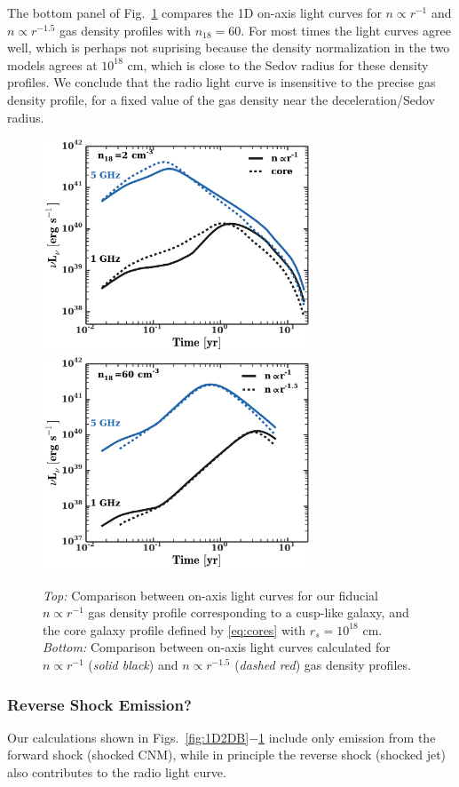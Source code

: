 \documentclass[usenatbib,fleqn]{mnras}
\begin{document}
The bottom panel of Fig.~\ref{fig:cores} compares the 1D on-axis light
curves for $n\propto r^{-1}$ and $n\propto r^{-1.5}$ gas density
profiles with $n_{18}=60$. For most times the light curves agree well,
which is perhaps not suprising because the density normalization in
the two models agrees at $10^{18}$ cm, which is close to the Sedov
radius for these density profiles.  We conclude that the radio light
curve is insensitive to the precise gas density profile, for a fixed
value of the gas density near the deceleration/Sedov radius.

\begin{figure} 
  \includegraphics[width=8cm]{fig_cores.pdf}
  \includegraphics[width=8cm]{profs2.pdf}
  \caption{\label{fig:cores} {\it Top:} Comparison between on-axis
    light curves for our fiducial $n\propto r^{-1}$ gas density
    profile corresponding to a cusp-like galaxy, and the core galaxy
    profile defined by \eqref{eq:cores} with $r_s=10^{18}$ cm. {\it
      Bottom:} Comparison between on-axis light curves calculated for
    $n\propto r^{-1}$ ({\it solid black}) and $n\propto r^{-1.5}$
    ({\it dashed red}) gas density profiles.}
\end{figure}


\subsubsection{Reverse Shock Emission?}
Our calculations shown in Figs.~\ref{fig:1D2DB}$-$\ref{fig:cores}
include only emission from the forward shock (shocked CNM), while in
principle the reverse shock (shocked jet) also contributes to the
radio light curve.
\end{document}
